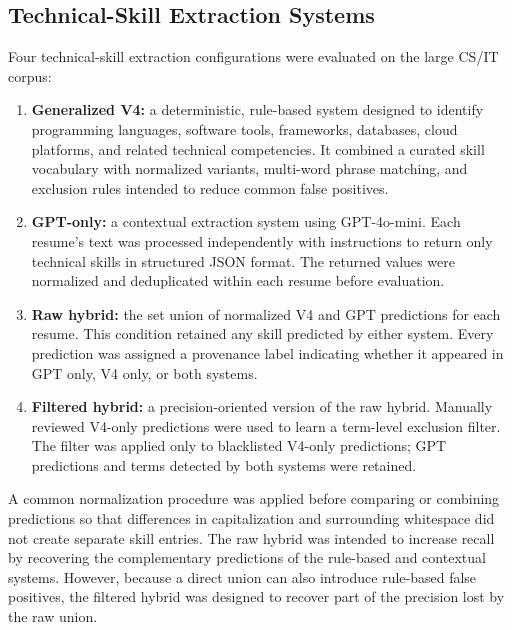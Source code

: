 \documentclass[conference]{IEEEtran}
\begin{document}
\subsection{Technical-Skill Extraction Systems}

Four technical-skill extraction configurations were evaluated on the
large CS/IT corpus:

\begin{enumerate}
    \item \textbf{Generalized V4:} a deterministic, rule-based system
    designed to identify programming languages, software tools,
    frameworks, databases, cloud platforms, and related technical
    competencies. It combined a curated skill vocabulary with
    normalized variants, multi-word phrase matching, and exclusion
    rules intended to reduce common false positives.

    \item \textbf{GPT-only:} a contextual extraction system using
    GPT-4o-mini. Each resume's text was processed independently with
    instructions to return only technical skills in structured JSON
    format. The returned values were normalized and deduplicated within
    each resume before evaluation.

    \item \textbf{Raw hybrid:} the set union of normalized V4 and GPT
    predictions for each resume. This condition retained any skill
    predicted by either system. Every prediction was assigned a
    provenance label indicating whether it appeared in GPT only, V4
    only, or both systems.

    \item \textbf{Filtered hybrid:} a precision-oriented version of the
    raw hybrid. Manually reviewed V4-only predictions were used to learn
    a term-level exclusion filter. The filter was applied only to
    blacklisted V4-only predictions; GPT predictions and terms detected
    by both systems were retained.
\end{enumerate}

A common normalization procedure was applied before comparing or
combining predictions so that differences in capitalization and
surrounding whitespace did not create separate skill entries. The raw
hybrid was intended to increase recall by recovering the complementary
predictions of the rule-based and contextual systems. However, because
a direct union can also introduce rule-based false positives, the
filtered hybrid was designed to recover part of the precision lost by
the raw union.
\end{document}

